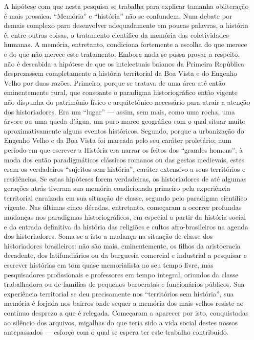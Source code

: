 A hipótese com que nesta pesquisa se trabalha para explicar tamanha obliteração é mais prosaica. ``Memória'' e ``história'' não se confundem. Num debate por demais complexo para desenvolver adequadamente em poucas palavras, a história é, entre outras coisas, o tratamento científico da memória das coletividades humanas. A memória, entretanto, condiciona fortemente a escolha do que merece e do que não merece este tratamento. Embora nada se possa provar a respeito, não é descabida a hipótese de que os intelectuais baianos da Primeira República desprezassem completamente a história territorial da Boa Vista e do Engenho Velho por duas razões. Primeiro, porque se tratava de uma área até então eminentemente rural, que consoante o paradigma historiográfico então vigente não dispunha do patrimônio físico e arquitetônico necessário para atrair a atenção dos historiadores. Era um ``lugar'' --- assim, sem mais, como uma rocha, uma árvore ou uma queda d'água, um puro marco geográfico com o qual situar muito aproximativamente alguns eventos históricos. Segundo, porque a urbanização do Engenho Velho e da Boa Vista foi marcada pelo seu caráter proletário; num período em que escrever a História era narrar os feitos dos ``grandes homens'', à moda dos então paradigmáticos clássicos romanos ou das gestas medievais, estes eram os verdadeiros ``sujeitos sem história'', caráter extensivo a seus territórios e residências. Se estas hipóteses forem verdadeiras, os historiadores de até algumas gerações atrás tiveram sua memória condicionada primeiro pela experiência territorial enraizada em sua situação de classe, segundo pelo paradigma científico vigente. Nas últimas cinco décadas, entretanto, começaram a ocorrer profundas mudanças nos paradigmas historiográficos, em especial a partir da história social e da entrada definitiva da história das religiões e cultos afro-brasileiros na agenda dos historiadores. Soma-se a isto a mudança na situação de classe dos historiadores brasileiros: não são mais, eminentemente, os filhos da aristocracia decadente, dos latifundiários ou da burguesia comercial e industrial a pesquisar e escrever histórias em tom quase memorialista no seu tempo livre, mas pesquisadores profissionais e professores em tempo integral, oriundos da classe trabalhadora ou de famílias de pequenos burocratas e funcionários públicos. Sua experiência territorial se deu precisamente nos ``territórios sem história'', sua memória é forjada nos bairros onde sequer a memória dos mais velhos resiste ao contínuo desprezo a que é relegada. Começaram a aparecer por isto, conquistadas ao silêncio dos arquivos, migalhas do que teria sido a vida social destes nossos antepassados --- esforço com o qual se espera ter este trabalho contribuído.

